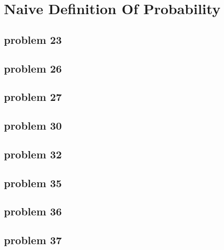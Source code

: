 \section{Naive Definition Of Probability}

\subsection{problem 23}


\subsection{problem 26}


\subsection{problem 27}


\subsection{problem 30}


\subsection{problem 32}


\subsection{problem 35}


\subsection{problem 36}


\subsection{problem 37}
